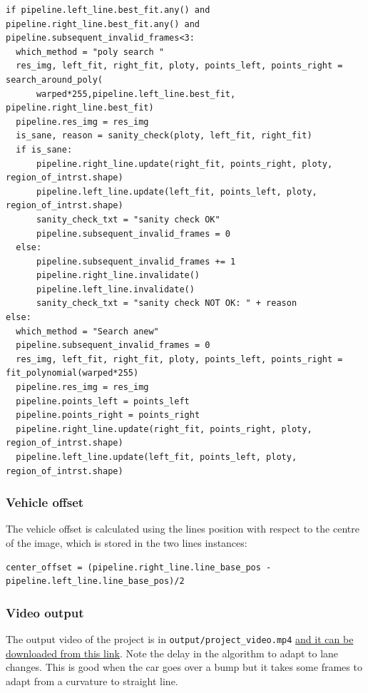 \documentclass{article}
\let\cd\lstinline
\begin{document}
\begin{lstlisting}
if pipeline.left_line.best_fit.any() and pipeline.right_line.best_fit.any() and pipeline.subsequent_invalid_frames<3:
  which_method = "poly search "
  res_img, left_fit, right_fit, ploty, points_left, points_right = search_around_poly(
      warped*255,pipeline.left_line.best_fit, pipeline.right_line.best_fit)
  pipeline.res_img = res_img
  is_sane, reason = sanity_check(ploty, left_fit, right_fit)
  if is_sane:
      pipeline.right_line.update(right_fit, points_right, ploty, region_of_intrst.shape)
      pipeline.left_line.update(left_fit, points_left, ploty, region_of_intrst.shape)
      sanity_check_txt = "sanity check OK"
      pipeline.subsequent_invalid_frames = 0
  else:
      pipeline.subsequent_invalid_frames += 1
      pipeline.right_line.invalidate()
      pipeline.left_line.invalidate()
      sanity_check_txt = "sanity check NOT OK: " + reason
else:
  which_method = "Search anew" 
  pipeline.subsequent_invalid_frames = 0
  res_img, left_fit, right_fit, ploty, points_left, points_right = fit_polynomial(warped*255)
  pipeline.res_img = res_img
  pipeline.points_left = points_left
  pipeline.points_right = points_right
  pipeline.right_line.update(right_fit, points_right, ploty, region_of_intrst.shape)
  pipeline.left_line.update(left_fit, points_left, ploty, region_of_intrst.shape)
\end{lstlisting}

\subsubsection{Vehicle offset}
\label{sec:advVehicleOffset}
The vehicle offset is calculated using the lines position with respect to the centre of the image, which is stored in the two lines instances:
\begin{lstlisting}
center_offset = (pipeline.right_line.line_base_pos - pipeline.left_line.line_base_pos)/2
\end{lstlisting}

\subsubsection{Video output}
The output video of the project is in \cd+output/project_video.mp4+ \href{https://github.com/FrancescoBoi/AdvancedLaneDetection/blob/master/output/project_video_advanced.mp4}{and it can be downloaded from this link}.
Note the delay in the algorithm to adapt to lane changes. This is good when the car goes over a bump but it takes some frames to adapt from a curvature to straight line.
\end{document}
